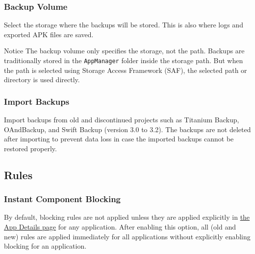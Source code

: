 \subsubsection{Backup Volume}\label{subsubsec:backup-volume} %
Select the storage where the backups will be stored. This is also where logs and exported APK files are saved.

\begin{tip}{Notice}
    The backup volume only specifies the storage, not the path. Backups are traditionally stored in the \texttt{AppManager} folder inside the storage path.
    But when the path is selected using Storage Access Framework (SAF), the selected path or directory is used directly.
\end{tip}

\subsubsection{Import Backups} %
Import backups from old and discontinued projects such as Titanium Backup, OAndBackup, and Swift Backup (version 3.0 to 3.2).
The backups are not deleted after importing to prevent data loss in case the imported backups cannot be restored properly.


\subsection{Rules}\label{subsec:rules} %

\subsubsection{Instant Component Blocking}\label{subsubsec:instant-component-blocking} %
By default, blocking rules are not applied unless they are applied explicitly in \hyperref[sec:app-details-page]{the App Details page} for any application.
After enabling this option, all (old and new) rules are applied immediately for all applications without explicitly enabling blocking for an application.


